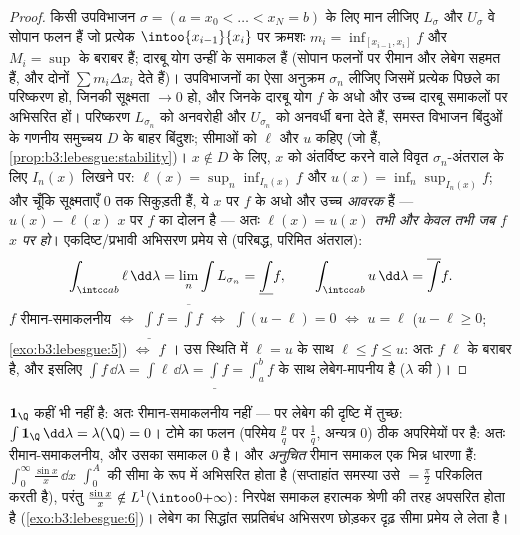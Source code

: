 \begin{proof}
किसी उपविभाजन $\sigma = (a = x_0 < \dots < x_N = b)$ के लिए मान लीजिए $L_\sigma$ और $U_\sigma$ वे सोपान फलन
हैं जो प्रत्येक $\intoo{x_{i-1}}{x_i}$ पर क्रमशः $m_i = \inf_{[x_{i-1}, x_i]}f$ और $M_i = \sup$ के बराबर हैं;
दारबू योग उन्हीं के समाकल हैं (सोपान फलनों पर रीमान और लेबेग सहमत
हैं, और दोनों $\sum
m_i\Delta x_i$ देते हैं)। उपविभाजनों का ऐसा अनुक्रम $\sigma_n$
लीजिए जिसमें प्रत्येक पिछले का परिष्करण हो, जिनकी सूक्ष्मता $\to 0$
हो, और जिनके दारबू योग $f$ के अधो और उच्च दारबू समाकलों पर
अभिसरित हों। परिष्करण $L_{\sigma_n}$ को अनवरोही और $U_{\sigma_n}$ को अनवर्धी बना
देते हैं, समस्त विभाजन बिंदुओं के गणनीय समुच्चय $D$ के बाहर
बिंदुशः; सीमाओं को $\ell$ और $u$ कहिए (जो  हैं, \cref{prop:b3:lebesgue:stability})।
$x \notin
D$ के लिए, $x$ को अंतर्विष्ट करने वाले विवृत $\sigma_n$-अंतराल के
लिए $I_n(x)$ लिखने पर: $\ell(x) = \sup_n\inf_{I_n(x)}f$ और $u(x) =
\inf_n\sup_{I_n(x)}f$; और चूँकि सूक्ष्मताएँ $0$
तक सिकुड़ती हैं, ये $x$ पर $f$ के अधो और उच्च \emph{आवरक} हैं
--- $u(x) - \ell(x)$ $x$ पर $f$ का दोलन है --- अतः \emph{$\ell(x) = u(x)$ तभी और
केवल तभी जब $f$ $x$ पर  हो}। एकदिष्ट/प्रभावी अभिसरण
प्रमेय से (परिबद्ध, परिमित अंतराल):
\[
\int_{\intcc ab}\ell\,\dd\lambda = \lim_n\int L_{\sigma_n}
= \underline{\int}f,
\qquad
\int_{\intcc ab}u\,\dd\lambda = \overline{\int}f .
\]
$f$ रीमान-समाकलनीय $\iff$ $\underline\int f =
\overline\int f$ $\iff$ $\int(u - \ell) = 0$ $\iff$ 
$u = \ell$ ($u - \ell \geq 0$; \cref{exo:b3:lebesgue:5}) $\iff$ $f$  । उस स्थिति में
 $\ell =
u$ के साथ $\ell \leq f \leq u$: अतः $f$  
$\ell$ के बराबर है, और इसलिए $\int f\,\dd\lambda = \int\ell\,\dd\lambda = \underline\int f =
\int_a^bf$ के साथ लेबेग-मापनीय है ($\lambda$ की
)।
\end{proof}

\begin{example}\label{ex:b3:lebesgue:riemannexamples}
$\mathbf 1_\Q$ कहीं भी  नहीं है: अतः रीमान-समाकलनीय नहीं --- पर लेबेग
की दृष्टि में तुच्छ: $\int\mathbf 1_\Q\,\dd\lambda =
\lambda(\Q) = 0$। टोमे का फलन (परिमेय $\frac pq$ पर $\frac1q$,
अन्यत्र $0$) ठीक अपरिमेयों पर  है: अतः रीमान-समाकलनीय, और
उसका समाकल $0$ है। और \emph{अनुचित} रीमान समाकल एक भिन्न धारणा
हैं: $\int_0^\infty\frac{\sin x}x\,\dd x$ $\int_0^A$ की सीमा के रूप में अभिसरित होता है (सप्ताहांत
समस्या उसे $= \frac\pi2$ परिकलित करती है), परंतु $\frac{\sin x}x \notin L^1(\intoo0{+\infty})$: निरपेक्ष समाकल
हरात्मक श्रेणी की तरह अपसरित होता है (\cref{exo:b3:lebesgue:6})। लेबेग का सिद्धांत
सप्रतिबंध अभिसरण छोड़कर दृढ़ सीमा प्रमेय ले लेता है।
\end{example}

